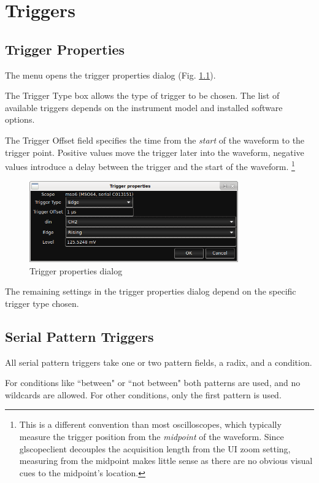 \chapter{Triggers}

\section{Trigger Properties}

The  menu opens the trigger properties dialog (Fig. \ref{trigger-properties}).

The Trigger Type box allows the type of trigger to be chosen. The list of available triggers depends on the instrument
model and installed software options.

The Trigger Offset field specifies the time from the \emph{start} of the waveform to the trigger point. Positive values
move the trigger later into the waveform, negative values introduce a delay between the trigger and the start of the
waveform. \footnote{This is a different convention than most oscilloscopes, which typically measure the trigger
position from the \emph{midpoint} of the waveform. Since glscopeclient decouples the acquisition length from the UI
zoom setting, measuring from the midpoint makes little sense as there are no obvious visual cues to the midpoint's
location.}

\begin{figure}[h]
\centering
\includegraphics[width=9cm]{images/trigger-properties.png}
\caption{Trigger properties dialog}
\label{trigger-properties}
\end{figure}

The remaining settings in the trigger properties dialog depend on the specific trigger type chosen.

\section{Serial Pattern Triggers}

All serial pattern triggers take one or two pattern fields, a radix, and a condition.

For conditions like ``between" or ``not between" both patterns are used, and no wildcards are allowed. For other
conditions, only the first pattern is used.


